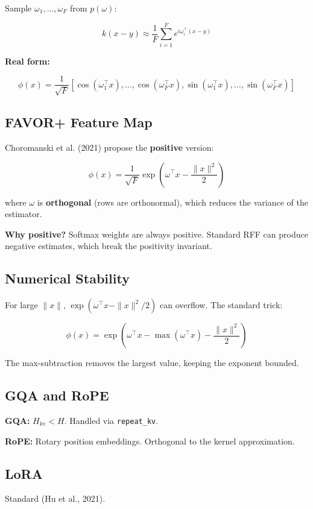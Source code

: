 Sample $\omega_1, \dots, \omega_F$ from $p(\omega)$:

\[
k(x - y) \approx \frac{1}{F} \sum_{i=1}^{F} e^{i \omega_i^\top (x - y)}
\tag{3.5}
\]

\textbf{Real form:}

\[
\phi(x) = \frac{1}{\sqrt{F}} [\cos(\omega_1^\top x), \dots, \cos(\omega_F^\top x), \sin(\omega_1^\top x), \dots, \sin(\omega_F^\top x)]
\tag{3.6}
\]

\subsection{FAVOR+ Feature Map}

Choromanski et al. (2021) propose the \textbf{positive} version:

\[
\phi(x) = \frac{1}{\sqrt{F}} \exp\!\left(\omega^\top x - \frac{\|x\|^2}{2}\right)
\tag{3.7}
\]

where $\omega$ is \textbf{orthogonal} (rows are orthonormal), which reduces the 
variance of the estimator.

\textbf{Why positive?} Softmax weights are always positive. Standard RFF can 
produce negative estimates, which break the positivity invariant.

\subsection{Numerical Stability}

For large $\|x\|$, $\exp(\omega^\top x - \|x\|^2/2)$ can overflow. The 
standard trick:

\[
\phi(x) = \exp\!\left(\omega^\top x - \max(\omega^\top x) - \frac{\|x\|^2}{2}\right)
\tag{3.8}
\]

The max-subtraction removes the largest value, keeping the exponent 
bounded.

\subsection{GQA and RoPE}

\textbf{GQA:} $H_{kv} < H$. Handled via \texttt{repeat\_kv}.

\textbf{RoPE:} Rotary position embeddings. Orthogonal to the kernel 
approximation.

\subsection{LoRA}

Standard (Hu et al., 2021).

